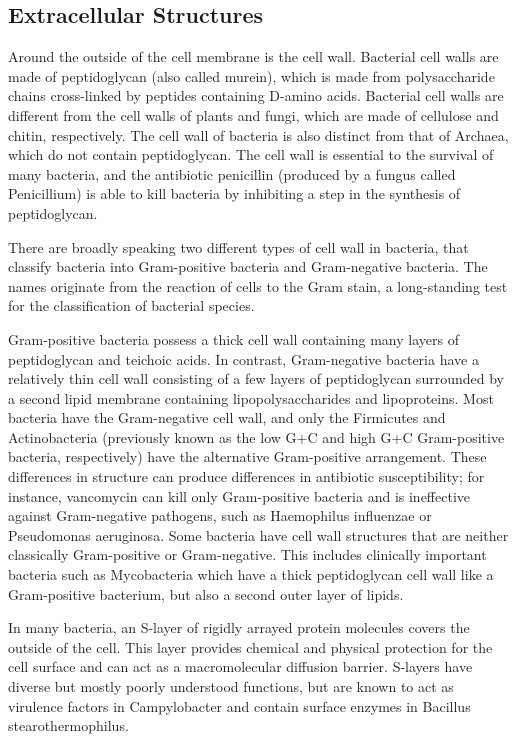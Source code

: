 \hypertarget{extracellular-structures}{%
\subsection{Extracellular Structures}\label{extracellular-structures}}

Around the outside of the cell membrane is the cell wall. Bacterial cell walls are made of peptidoglycan (also called murein), which is made from polysaccharide chains cross-linked by peptides containing D-amino acids. Bacterial cell walls are different from the cell walls of plants and fungi, which are made of cellulose and chitin, respectively. The cell wall of bacteria is also distinct from that of Archaea, which do not contain peptidoglycan. The cell wall is essential to the survival of many bacteria, and the antibiotic penicillin (produced by a fungus called Penicillium) is able to kill bacteria by inhibiting a step in the synthesis of peptidoglycan.

There are broadly speaking two different types of cell wall in bacteria, that classify bacteria into Gram-positive bacteria and Gram-negative bacteria. The names originate from the reaction of cells to the Gram stain, a long-standing test for the classification of bacterial species.

Gram-positive bacteria possess a thick cell wall containing many layers of peptidoglycan and teichoic acids. In contrast, Gram-negative bacteria have a relatively thin cell wall consisting of a few layers of peptidoglycan surrounded by a second lipid membrane containing lipopolysaccharides and lipoproteins. Most bacteria have the Gram-negative cell wall, and only the Firmicutes and Actinobacteria (previously known as the low G+C and high G+C Gram-positive bacteria, respectively) have the alternative Gram-positive arrangement. These differences in structure can produce differences in antibiotic susceptibility; for instance, vancomycin can kill only Gram-positive bacteria and is ineffective against Gram-negative pathogens, such as Haemophilus influenzae or Pseudomonas aeruginosa. Some bacteria have cell wall structures that are neither classically Gram-positive or Gram-negative. This includes clinically important bacteria such as Mycobacteria which have a thick peptidoglycan cell wall like a Gram-positive bacterium, but also a second outer layer of lipids.

In many bacteria, an S-layer of rigidly arrayed protein molecules covers the outside of the cell. This layer provides chemical and physical protection for the cell surface and can act as a macromolecular diffusion barrier. S-layers have diverse but mostly poorly understood functions, but are known to act as virulence factors in Campylobacter and contain surface enzymes in Bacillus stearothermophilus.



